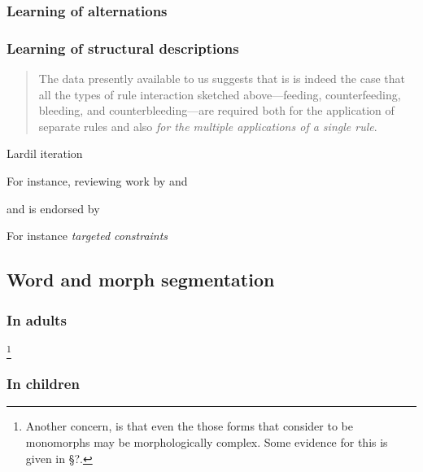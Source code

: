 \subsubsection{Learning of alternations}

\citet{White2008}

\subsubsection{Learning of structural descriptions}

\citet{Hayes2008}

\begin{quotation}
The data presently available to us suggests that is is indeed the case that all the types of rule interaction sketched above---feeding, counterfeeding, bleeding, and counterbleeding---are required both for the application of separate rules and also \emph{for the multiple applications of a single rule}. \citep[][327, emphasis mine]{Kenstowicz1979} 
\end{quotation}

Lardil iteration
\citet{McCarthy2003a}

\citet{Anderson1969}
\citet{Howard1972}
\citet{Kenstowicz1973} 
For instance, reviewing work by \citet{Johnson1972} and \citet{Kaplan1994}

and is endorsed by \citet[][101]{Kiparsky1973c}

\citet{Gorman2011b}

For instance
\emph{targeted constraints}
\citet{Wilson2001}

\subsection{Word and morph segmentation}


\subsubsection{In adults}
\citet{Hay2004a}

\footnote{Another concern, is that even the those forms that \citeauthor{Hay2004a} consider to be monomorphs may be morphologically complex. Some evidence for this is given in \S?.}

\subsubsection{In children}

